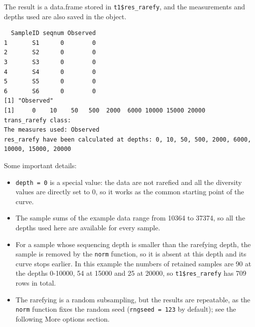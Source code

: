 \documentclass[
]{book}
\newenvironment{Shaded}{\begin{snugshade}}{\end{snugshade}}
\newcommand{\CommentTok}[1]{\textcolor[rgb]{0.56,0.35,0.01}{\textit{#1}}}
\newcommand{\FunctionTok}[1]{\textcolor[rgb]{0.13,0.29,0.53}{\textbf{#1}}}
\newcommand{\NormalTok}[1]{#1}
\newcommand{\SpecialCharTok}[1]{\textcolor[rgb]{0.81,0.36,0.00}{\textbf{#1}}}
\providecommand{\tightlist}{%
  \setlength{\itemsep}{0pt}\setlength{\parskip}{0pt}}
\begin{document}
The result is a data.frame stored in \texttt{t1\$res\_rarefy}, and the measurements and depths used are also
saved in the object.

\begin{Shaded}
\end{Shaded}

\begin{verbatim}
  SampleID seqnum Observed
1       S1      0        0
2       S2      0        0
3       S3      0        0
4       S4      0        0
5       S5      0        0
6       S6      0        0
[1] "Observed"
[1]     0    10    50   500  2000  6000 10000 15000 20000
trans_rarefy class:
The measures used: Observed 
res_rarefy have been calculated at depths: 0, 10, 50, 500, 2000, 6000, 10000, 15000, 20000 
\end{verbatim}

Some important details:

\begin{itemize}
\tightlist
\item
  \texttt{depth\ =\ 0} is a special value: the data are not rarefied and all the diversity values are directly set
  to 0, so it works as the common starting point of the curve.
\item
  The sample sums of the example data range from 10364 to 37374, so all the depths used here are available
  for every sample.
\item
  For a sample whose sequencing depth is smaller than the rarefying depth, the sample is removed by the
  \texttt{norm} function, so it is absent at this depth and its curve stops earlier.
  In this example the numbers of retained samples are 90 at the depths 0-10000, 54 at 15000 and 25 at
  20000, so \texttt{t1\$res\_rarefy} has 709 rows in total.
\item
  The rarefying is a random subsampling, but the results are repeatable, as the \texttt{norm} function fixes the
  random seed (\texttt{rngseed\ =\ 123} by default); see the following More options section.
\end{itemize}
\end{document}

